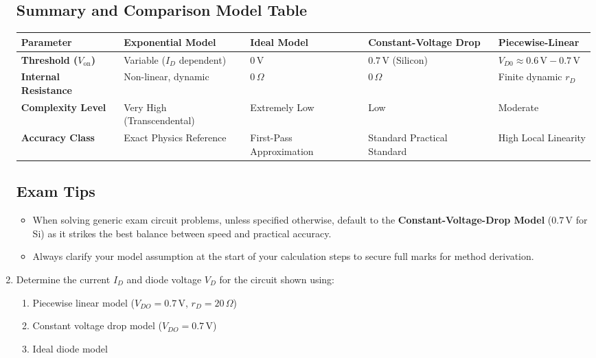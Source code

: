 \documentclass[12pt,a3paper]{article}
\begin{document}
\begin{enumerate}
\begin{tcolorbox}[enhanced,breakable,ansbox,colback=cA!4,colframe=cA,boxrule=0.8pt,arc=5pt,title={\textbf{Answer}},fonttitle=\bfseries\color{white},colbacktitle=cA]
\subsection*{Summary and Comparison Model Table}

\begin{center}
\begin{tabularx}{\textwidth}{lXXXX}
\toprule
\textbf{Parameter} & \textbf{Exponential Model} & \textbf{Ideal Model} & \textbf{Constant-Voltage Drop} & \textbf{Piecewise-Linear} \\
\midrule
\textbf{Threshold ($V_{\text{on}}$)} & Variable ($I_D$ dependent) & $0\,\text{V}$ & $0.7\,\text{V}$ (Silicon) & $V_{D0} \approx 0.6\,\text{V} - 0.7\,\text{V}$ \\
\textbf{Internal Resistance} & Non-linear, dynamic & $0\,\Omega$ & $0\,\Omega$ & Finite dynamic $r_D$ \\
\textbf{Complexity Level} & Very High (Transcendental) & Extremely Low & Low & Moderate \\
\textbf{Accuracy Class} & Exact Physics Reference & First-Pass Approximation & Standard Practical Standard & High Local Linearity \\
\bottomrule
\end{tabularx}
\end{center}

\subsection*{Exam Tips}
\begin{itemize}
    \item When solving generic exam circuit problems, unless specified otherwise, default to the \textbf{Constant-Voltage-Drop Model} ($0.7\,\text{V}$ for Si) as it strikes the best balance between speed and practical accuracy.
    \item Always clarify your model assumption at the start of your calculation steps to secure full marks for method derivation.
\end{itemize}

\end{tcolorbox}

\item Determine the current $I_D$ and diode voltage $V_D$ for the circuit shown using:
\begin{enumerate}
  \item Piecewise linear model ($V_{DO}=0.7\,\text{V}$, $r_D=20\,\Omega$)
  \item Constant voltage drop model ($V_{DO}=0.7\,\text{V}$)
  \item Ideal diode model
\end{enumerate}
\begin{center}
\begin{circuitikz}[thick,american, thick, scale=1.2, transform shape]
  

\end{circuitikz}
\end{center}
\end{enumerate}
\end{document}
